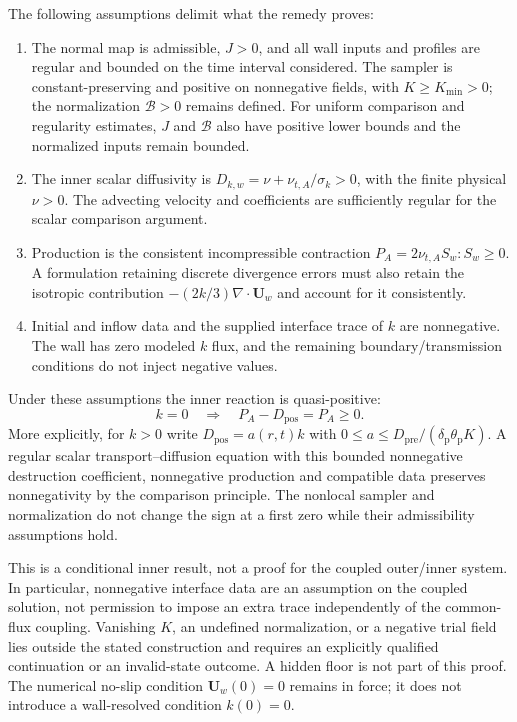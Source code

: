 \documentclass[11pt,a4paper]{article}
\numberwithin{equation}{section}
\begin{document}
The following assumptions delimit what the remedy proves:
\begin{enumerate}
 \item The normal map is admissible, $J>0$, and all wall inputs and
       profiles are regular and bounded on the time interval considered.
       The sampler is constant-preserving and positive on nonnegative
       fields, with $K\ge K_{\min}>0$; the normalization
       $\mathcal B>0$ remains defined. For uniform comparison and
       regularity estimates, $J$ and $\mathcal B$ also have positive
       lower bounds and the normalized inputs remain bounded.
 \item The inner scalar diffusivity is
       $D_{k,w}=\nu+\nu_{t,A}/\sigma_k>0$, with the finite physical
       $\nu>0$. The advecting velocity and coefficients are sufficiently
       regular for the scalar comparison argument.
 \item Production is the consistent incompressible contraction
       $P_A=2\nu_{t,A}S_w:S_w\ge0$. A formulation retaining discrete
       divergence errors must also retain the isotropic contribution
       $-(2k/3)\nabla\cdot\boldsymbol U_w$ and account for it consistently.
 \item Initial and inflow data and the supplied interface trace of
       $k$ are nonnegative. The wall has zero modeled $k$ flux, and
       the remaining boundary/transmission conditions do not inject
       negative values.
\end{enumerate}

Under these assumptions the inner reaction is quasi-positive:
\[
 k=0\quad\Longrightarrow\quad
 P_A-D_{\mathrm{pos}}=P_A\ge0.
\]
More explicitly, for $k>0$ write
$D_{\mathrm{pos}}=a(r,t)k$ with
$0\le a\le D_{\mathrm{pre}}/
(\delta_{\mathrm p}\theta_{\mathrm p}K)$.
A regular scalar transport--diffusion equation with this bounded
nonnegative destruction coefficient, nonnegative production and
compatible data preserves nonnegativity by the comparison principle.
The nonlocal sampler and normalization do not change the sign at
a first zero while their admissibility assumptions hold.

This is a conditional inner result, not a proof for the coupled
outer/inner system. In particular, nonnegative interface data are
an assumption on the coupled solution, not permission to impose
an extra trace independently of the common-flux coupling.
Vanishing $K$, an undefined normalization, or a negative trial field
lies outside the stated construction and requires an explicitly
qualified continuation or an invalid-state outcome. A hidden floor
is not part of this proof.
The numerical no-slip condition $\boldsymbol U_w(0)=0$ remains in
force; it does not introduce a wall-resolved condition $k(0)=0$.
\end{document}
